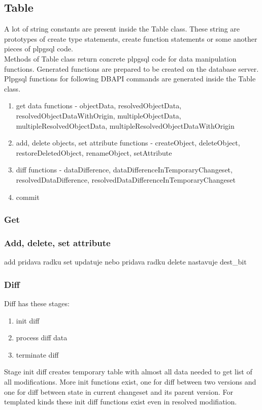 \documentclass[deska]{subfiles}
\begin{document}
\subsection{Table}
A lot of string constants are present inside the Table class. These string are prototypes of create type statements, create function statements or some another pieces of plpgsql code.\\
Methods of Table class return concrete plpgsql code for data manipulation functions. Generated functions are prepared to be created on the database server.\\
Plpgsql functions for following DBAPI commands are generated inside the Table class.

\begin{enumerate}
	\item get data functions - objectData, resolvedObjectData, resolvedObjectDataWithOrigin, multipleObjectData, multipleResolvedObjectData, multipleResolvedObjectDataWithOrigin
	\item add, delete objects, set attribute functions - createObject, deleteObject, restoreDeletedObject, renameObject, setAttribute
	\item diff functions - dataDifference, dataDifferenceInTemporaryChangeset, resolvedDataDifference, resolvedDataDifferenceInTemporaryChangeset
	\item commit
\end{enumerate}

\subsubsection{Get}

\subsubsection{Add, delete, set attribute}
add pridava radku
set updatuje nebo pridava radku
delete nastavuje dest\_bit

\subsubsection{Diff}

Diff has these stages:
\begin{enumerate}
	\item init diff
	\item process diff data
	\item terminate diff
\end{enumerate}
Stage init diff creates temporary table with almost all data needed to get list of all modifications.
More init functions exist, one for diff between two versions and one for diff between state in current changeset and its parent version. For templated kinds these init diff functions exist even in resolved modifiation.\\
\end{document}
